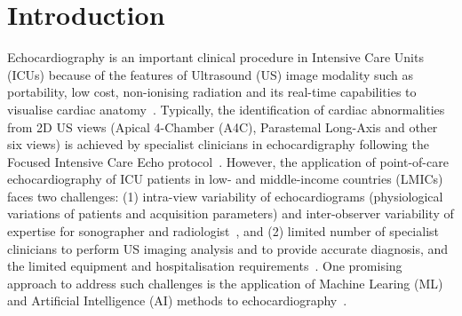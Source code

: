 \documentclass[mlabstract,twocolumn]{jmlr}
\begin{document}
\section{Introduction}
\label{sec:intro}
Echocardiography is an important clinical procedure in Intensive Care Units (ICUs) because of the features of Ultrasound (US) image modality such as portability, low cost, non-ionising radiation and its real-time capabilities to visualise cardiac anatomy~\citep{Vieillard-Baron2008, cambell2018}. %
Typically, the identification of cardiac abnormalities from 2D US views (Apical 4-Chamber (A4C), Parastemal Long-Axis and other six views) is achieved by specialist clinicians in echocardigraphy following the Focused Intensive Care Echo protocol~\citep{2017_hall_JIntensiveCareSociety}. %
However, the application of point-of-care echocardiography of ICU patients in low- and middle-income countries (LMICs) faces two challenges:
(1) intra-view variability of echocardiograms (physiological variations of patients and acquisition parameters) and inter-observer variability of expertise for sonographer and radiologist~\citep{Feigenbaum1996, khamis2017, field2011}, and
(2) limited number of specialist clinicians to perform US imaging analysis and to provide accurate diagnosis, and the limited equipment and hospitalisation requirements~\citep{2016_becker_in_TropicalMedicineInternationalHealth, hao2021-wellcome, 2021-huyNhat-vanHao-in-FAIR-MICCAI}.
One promising approach to address such challenges is the application of Machine Learing (ML) and Artificial Intelligence (AI) methods to echocardiography~\citep{2022asch_AmericanSocietyofEchocardiography}.
\end{document}
